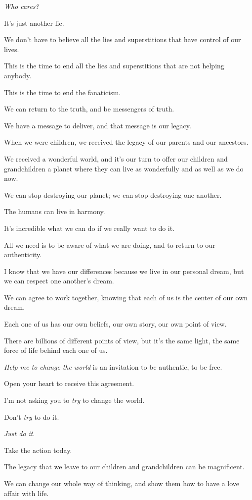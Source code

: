 \documentclass{article}
\numberwithin{equation}{section}
\begin{document}
\textit{Who cares?}

It's just another lie.

We don't have to believe all the lies and superstitions that have control of our lives.

This is the time to end all the lies and superstitions that are not helping anybody.

This is the time to end the fanaticism.

We can return to the truth, and be messengers of truth.

%
We have a message to deliver, and that message is our legacy.

When we were children, we received the legacy of our parents and our ancestors.

We received a wonderful world, and it's our turn to offer our children and grandchildren a planet where they can live as wonderfully and as well as we do now.

We can stop destroying our planet; we can stop destroying one another.

The humans can live in harmony.

It's incredible what we can do if we really want to do it.

All we need is to be aware of what we are doing, and to return to our authenticity.

%
I know that we have our differences because we live in our personal dream, but we can respect one another's dream.

We can agree to work together, knowing that each of us is the center of our own dream.

Each one of us has our own beliefs, our own story, our own point of view.

There are billions of different points of view, but it's the same light, the same force of life behind each one of us.

%
\textit{Help me to change the world} is an invitation to be authentic, to be free.

Open your heart to receive this agreement.

I'm not asking you to \textit{try} to change the world.

Don't \textit{try} to do it.

\textit{Just do it}.

Take the action today.

The legacy that we leave to our children and grandchildren can be magnificent.

We can change our whole way of thinking, and show them how to have a love affair with life.
\end{document}
